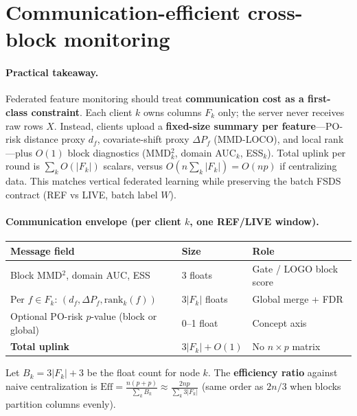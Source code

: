
\section{Communication-efficient cross-block monitoring}

\paragraph{Practical takeaway.}
Federated feature monitoring should treat \textbf{communication cost as a first-class constraint}.
Each client $k$ owns columns $F_k$ only; the server never receives raw rows $X$.
Instead, clients upload a \textbf{fixed-size summary per feature}---PO-risk distance proxy $d_f$, covariate-shift proxy $\Delta P_f$ (MMD-LOCO), and local rank---plus $O(1)$ block diagnostics (MMD$^2_k$, domain AUC$_k$, ESS$_k$).
Total uplink per round is $\sum_k O(|F_k|)$ scalars, versus $O(n\sum_k |F_k|)=O(np)$ if centralizing data.
This matches vertical federated learning while preserving the batch FSDS contract (REF vs LIVE, batch label $W$).

\paragraph{Communication envelope (per client $k$, one REF/LIVE window).}
\begin{center}
\small
\begin{tabular}{@{}lll@{}}
\toprule
\textbf{Message field} & \textbf{Size} & \textbf{Role} \\
\midrule
Block MMD$^2$, domain AUC, ESS & 3 floats & Gate / LOGO block score \\
Per $f\in F_k$: $(d_f, \Delta P_f, \text{rank}_k(f))$ & $3|F_k|$ floats & Global merge + FDR \\
Optional PO-risk $p$-value (block or global) & 0--1 float & Concept axis \\
\midrule
\textbf{Total uplink} & $3|F_k|+O(1)$ & No $n\times p$ matrix \\
\bottomrule
\end{tabular}
\end{center}
Let $B_k=3|F_k|+3$ be the float count for node $k$.
The \textbf{efficiency ratio} against naive centralization is
$\mathrm{Eff}= \frac{n(p+p)}{ \sum_k B_k } \approx \frac{2np}{\sum_k 3|F_k|}$ (same order as $2n/3$ when blocks partition columns evenly).

